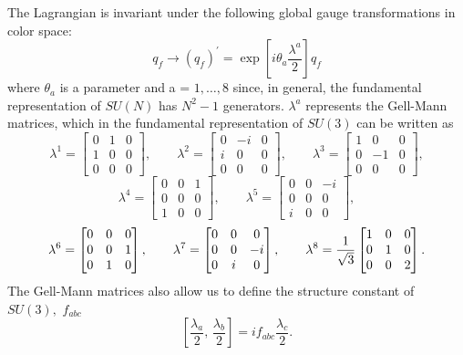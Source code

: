 \documentclass[10pt,a4paper]{book}
\begin{document}
The Lagrangian is invariant under the following global gauge transformations in color space:
\begin{equation}
q_f \rightarrow (q_f)^\prime = \exp[i\theta_a\frac{\lambda^a}{2}]q_f
\end{equation}
where $\theta_a$ is a parameter and a = $1, \dots, 8$ since, in general, the fundamental representation of $SU(N)$ has $N^2 - 1$ generators. $\lambda^a$ represents the Gell-Mann matrices, which in the fundamental representation of $SU(3)$ can be written as
\begin{equation*}
\lambda^1 = \begin{bmatrix} 0 & 1 & 0 \\ 1 & 0 & 0 \\ 0 & 0 & 0 \end{bmatrix}, \qquad
\lambda^2 = \begin{bmatrix} 0 & -i & 0 \\ i & 0 & 0 \\ 0 & 0 & 0 \end{bmatrix}, \qquad
\lambda^3 = \begin{bmatrix} 1 & 0 & 0 \\ 0 & -1 & 0 \\ 0 & 0 & 0 \end{bmatrix},
\end{equation*}
\begin{equation}
\lambda^4 = \begin{bmatrix} 0 & 0 & 1 \\ 0 & 0 & 0 \\ 1 & 0 & 0 \end{bmatrix}, \qquad
\lambda^5 = \begin{bmatrix} 0 & 0 & -i \\ 0 & 0 & 0 \\ i & 0 & 0 \end{bmatrix},
\end{equation}
\begin{equation*}
\lambda^6 = \begin{bmatrix} 0 & 0 & 0 \\ 0 & 0 & 1 \\ 0 & 1 & 0 \end{bmatrix},\qquad
\lambda^7 = \begin{bmatrix} 0 & 0 & 0 \\ 0 & 0 & -i \\ 0 & i & 0 \end{bmatrix}, \qquad
\lambda^8 = \frac{1}{\sqrt{3}} \begin{bmatrix} 1 & 0 & 0 \\ 0 & 1 & 0 \\ 0 & 0 & 2
\end{bmatrix}.\\
\end{equation*}
The Gell-Mann matrices also allow us to define the structure constant of $SU(3),$ $f_{abc}$
\begin{equation}
\left[\frac{\lambda_a}{2}, \, \frac{\lambda_b}{2}\right] = if_{abc}\frac{\lambda_c}{2}. 
\end{equation}
\end{document}
